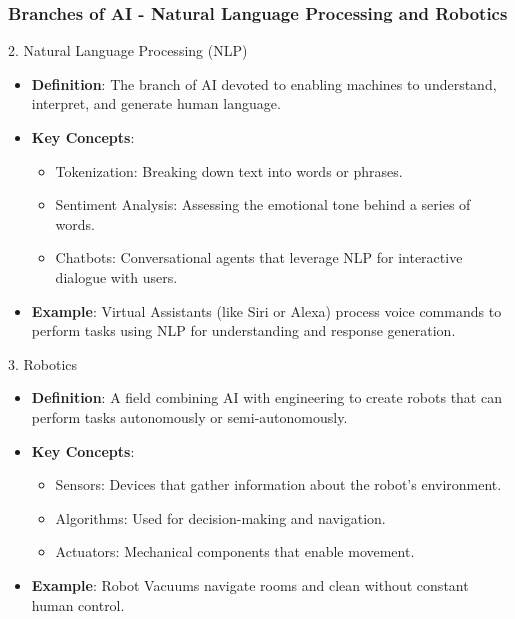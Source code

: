 \documentclass{beamer}
\begin{document}
\begin{frame}[fragile]
    \frametitle{Branches of AI - Natural Language Processing and Robotics}
    \begin{block}{2. Natural Language Processing (NLP)}
        \begin{itemize}
            \item \textbf{Definition}: The branch of AI devoted to enabling machines to understand, interpret, and generate human language.
            \item \textbf{Key Concepts}:
            \begin{itemize}
                \item Tokenization: Breaking down text into words or phrases.
                \item Sentiment Analysis: Assessing the emotional tone behind a series of words.
                \item Chatbots: Conversational agents that leverage NLP for interactive dialogue with users.
            \end{itemize}
            \item \textbf{Example}: Virtual Assistants (like Siri or Alexa) process voice commands to perform tasks using NLP for understanding and response generation.
        \end{itemize}
    \end{block}

    \begin{block}{3. Robotics}
        \begin{itemize}
            \item \textbf{Definition}: A field combining AI with engineering to create robots that can perform tasks autonomously or semi-autonomously.
            \item \textbf{Key Concepts}:
            \begin{itemize}
                \item Sensors: Devices that gather information about the robot's environment.
                \item Algorithms: Used for decision-making and navigation.
                \item Actuators: Mechanical components that enable movement.
            \end{itemize}
            \item \textbf{Example}: Robot Vacuums navigate rooms and clean without constant human control.
        \end{itemize}
    \end{block}
\end{frame}
\end{document}
